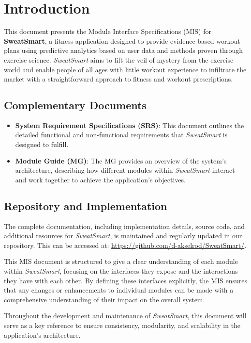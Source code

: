 \documentclass[12pt, titlepage]{article}
\begin{document}
\section{Introduction}

This document presents the Module Interface Specifications (MIS) for \textbf{SweatSmart}, a fitness application designed to provide evidence-based workout plans using predictive analytics based on user data and methods proven through exercise science. \textit{SweatSmart} aims to lift the veil of mystery from the exercise world and enable people of all ages with little workout experience to infiltrate the market with a straightforward approach to fitness and workout prescriptions.

\subsection{Complementary Documents}
\begin{itemize}
    \item \textbf{System Requirement Specifications (SRS)}: This document outlines the detailed functional and non-functional requirements that \textit{SweatSmart} is designed to fulfill.
    \item \textbf{Module Guide (MG)}: The MG provides an overview of the system’s architecture, describing how different modules within \textit{SweatSmart} interact and work together to achieve the application's objectives.
\end{itemize}

\subsection{Repository and Implementation}
The complete documentation, including implementation details, source code, and additional resources for \textit{SweatSmart}, is maintained and regularly updated in our repository. This can be accessed at: \url{https://github.com/d-akselrod/SweatSmart/}.

This MIS document is structured to give a clear understanding of each module within \textit{SweatSmart}, focusing on the interfaces they expose and the interactions they have with each other. By defining these interfaces explicitly, the MIS ensures that any changes or enhancements to individual modules can be made with a comprehensive understanding of their impact on the overall system.

Throughout the development and maintenance of \textit{SweatSmart}, this document will serve as a key reference to ensure consistency, modularity, and scalability in the application's architecture.
\end{document}
